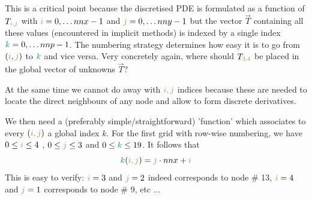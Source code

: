 \vspace{.5cm}

\begin{minipage}[t]{\textwidth}
\\
\end{minipage}

\vspace{.5cm}

This is a critical point because the discretised PDE is formulated as a 
function of $T_{{\color{brown} i,j}}$ 
with ${\color{brown}i}=0,\dots nnx-1$ and ${\color{brown}j}=0,\dots nny-1$ 
but the vector $\vec{T}$ containing all these values (encountered in 
implicit methods)
is indexed by a single index ${\color{teal}k}=0,\dots nnp-1$. The numbering strategy determines how easy
it is to go from $({\color{brown}i},{\color{brown}j})$ to ${\color{teal}k}$ and vice versa. 
Very concretely again, where should $T_{\color{brown}3,4}$ be placed in the global 
vector of unknowns $\vec{T}$?

At the same time we cannot do away with ${\color{brown}i,j}$ indices because these are 
needed to locate the direct neighbours of any node and allow to 
form discrete derivatives. 

We then need a (preferably simple/straightforward) 'function' 
which associates to every $({\color{brown} i,j})$ a global index $k$. 
For the first grid with row-wise numbering, we have 
$0\leq {\color{brown}i} \leq 4$ , $0 \leq {\color{brown}j} \leq 3$ 
and $0 \leq {\color{teal}k} \leq 19$. It follows that 
\begin{equation}
{\color{teal} k}({\color{brown}i,j})={\color{brown}j} \cdot nnx+{\color{brown}i}
\end{equation}
This is easy to verify: ${\color{brown}i}=3$ and ${\color{brown}j}=2$ 
indeed corresponds to node \# 13, 
${\color{brown}i}=4$ and ${\color{brown}j}=1$ corresponds to node \# 9, etc ...

\begin{minipage}[t]{\textwidth}
\begin{center}

\end{center}
\end{minipage}


